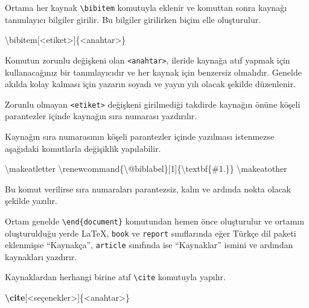 \documentclass[
  10pt,
]{scrbook}
\newenvironment{Shaded}{\begin{snugshade}}{\end{snugshade}}
\newcommand{\ExtensionTok}[1]{#1}
\newcommand{\FunctionTok}[1]{\textcolor[rgb]{0.00,0.00,0.00}{#1}}
\newcommand{\KeywordTok}[1]{\textcolor[rgb]{0.13,0.29,0.53}{\textbf{#1}}}
\newcommand{\NormalTok}[1]{#1}
\theoremstyle{definition}
\theoremstyle{definition}
\theoremstyle{definition}
\theoremstyle{definition}
\theoremstyle{remark}
\begin{document}
Ortama her kaynak \texttt{\textbackslash{}bibitem} komutuyla eklenir ve komuttan sonra kaynağı tanımlayıcı bilgiler girilir. Bu bilgiler girilirken biçim elle oluşturulur.

\begin{Shaded}
\begin{Highlighting}[]
\FunctionTok{\textbackslash{}bibitem}\NormalTok{[\textless{}etiket\textgreater{}]\{\textless{}anahtar\textgreater{}\}}
\end{Highlighting}
\end{Shaded}

Komutun zorunlu değişkeni olan \texttt{\textless{}anahtar\textgreater{}}, ileride kaynağa atıf yapmak için kullanacağınız bir tanımlayıcıdır ve her kaynak için benzersiz olmalıdır. Genelde akılda kolay kalması için yazarın soyadı ve yayın yılı olacak şekilde düzenlenir.

Zorunlu olmayan \texttt{\textless{}etiket\textgreater{}} değişkeni girilmediği takdirde kaynağın önüne köşeli parantezler içinde kaynağın sıra numarası yazdırılır.

Kaynağın sıra numarasının köşeli parantezler içinde yazılması istenmezse aşağıdaki komutlarla değişiklik yapılabilir.

\begin{Shaded}
\begin{Highlighting}[]
\FunctionTok{\textbackslash{}makeatletter}
\FunctionTok{\textbackslash{}renewcommand}\NormalTok{\{}\ExtensionTok{\textbackslash{}@biblabel}\NormalTok{\}[1]\{}\FunctionTok{\textbackslash{}textbf}\NormalTok{\{\#1.\}\}}
\FunctionTok{\textbackslash{}makeatother}
\end{Highlighting}
\end{Shaded}

Bu komut verilirse sıra numaraları parantezsiz, kalın ve ardında nokta olacak şekilde yazılır.

Ortam genelde \texttt{\textbackslash{}end\{document\}} komutundan hemen önce oluşturulur ve ortamın oluşturulduğu yerde LaTeX, \texttt{book} ve \texttt{report} sınıflarında eğer Türkçe dil paketi eklenmişse ``Kaynakça'', \texttt{article} sınıfında ise ``Kaynaklar'' ismini ve ardından kaynakları yazdırır.

Kaynaklardan herhangi birine atıf \texttt{\textbackslash{}cite} komutuyla yapılır.

\begin{Shaded}
\begin{Highlighting}[]
\KeywordTok{\textbackslash{}cite}\NormalTok{[\textless{}seçenekler\textgreater{}]\{}\ExtensionTok{\textless{}anahtar\textgreater{}}\NormalTok{\}}
\end{Highlighting}
\end{Shaded}
\end{document}
